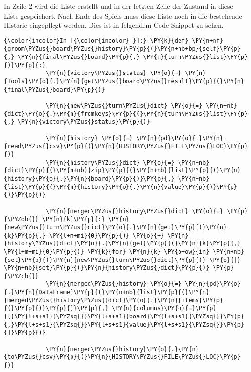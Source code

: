    In Zeile 2 wird die Liste erstellt und in der letzten Zeile der Zustand
in diese Liste gespeichert. Nach Ende des Spiels muss diese Liste noch
in die bestehende Historie eingepflegt werden. Dies ist in folgendem
Code-Snippet zu sehen.

    \begin{Verbatim}[commandchars=\\\{\}]
{\color{incolor}In [{\color{incolor} }]:} \PY{k}{def} \PY{n+nf}{groom\PYZus{}board\PYZus{}history}\PY{p}{(}\PY{n+nb+bp}{self}\PY{p}{,} \PY{n}{final\PYZus{}board}\PY{p}{,} \PY{n}{turn\PYZus{}list}\PY{p}{)}\PY{p}{:}
            \PY{n}{victory\PYZus{}status} \PY{o}{=} \PY{n}{Tools}\PY{o}{.}\PY{n}{get\PYZus{}board\PYZus{}result}\PY{p}{(}\PY{n}{final\PYZus{}board}\PY{p}{)}
        
            \PY{n}{new\PYZus{}turn\PYZus{}dict} \PY{o}{=} \PY{n+nb}{dict}\PY{o}{.}\PY{n}{fromkeys}\PY{p}{(}\PY{n}{turn\PYZus{}list}\PY{p}{,} \PY{n}{victory\PYZus{}status}\PY{p}{)}
        
            \PY{n}{history} \PY{o}{=} \PY{n}{pd}\PY{o}{.}\PY{n}{read\PYZus{}csv}\PY{p}{(}\PY{n}{HISTORY\PYZus{}FILE\PYZus{}LOC}\PY{p}{)}
            \PY{n}{history\PYZus{}dict} \PY{o}{=} \PY{n+nb}{dict}\PY{p}{(}\PY{n+nb}{zip}\PY{p}{(}\PY{n+nb}{list}\PY{p}{(}\PY{n}{history}\PY{o}{.}\PY{n}{board}\PY{p}{)}\PY{p}{,} \PY{n+nb}{list}\PY{p}{(}\PY{n}{history}\PY{o}{.}\PY{n}{value}\PY{p}{)}\PY{p}{)}\PY{p}{)}
        
            \PY{n}{merged\PYZus{}history\PYZus{}dict} \PY{o}{=} \PY{p}{\PYZob{}} \PY{n}{k}\PY{p}{:} \PY{n}{new\PYZus{}turn\PYZus{}dict}\PY{o}{.}\PY{n}{get}\PY{p}{(}\PY{n}{k}\PY{p}{,} \PY{l+m+mi}{0}\PY{p}{)} \PY{o}{+} \PY{n}{history\PYZus{}dict}\PY{o}{.}\PY{n}{get}\PY{p}{(}\PY{n}{k}\PY{p}{,} \PY{l+m+mi}{0}\PY{p}{)} \PY{k}{for} \PY{n}{k} \PY{o+ow}{in} \PY{n+nb}{set}\PY{p}{(}\PY{n}{new\PYZus{}turn\PYZus{}dict}\PY{p}{)} \PY{o}{|} \PY{n+nb}{set}\PY{p}{(}\PY{n}{history\PYZus{}dict}\PY{p}{)} \PY{p}{\PYZcb{}}
            \PY{n}{merged\PYZus{}history} \PY{o}{=} \PY{n}{pd}\PY{o}{.}\PY{n}{DataFrame}\PY{p}{(}\PY{n+nb}{list}\PY{p}{(}\PY{n}{merged\PYZus{}history\PYZus{}dict}\PY{o}{.}\PY{n}{items}\PY{p}{(}\PY{p}{)}\PY{p}{)}\PY{p}{,} \PY{n}{columns}\PY{o}{=}\PY{p}{[}\PY{l+s+s1}{\PYZsq{}}\PY{l+s+s1}{board}\PY{l+s+s1}{\PYZsq{}}\PY{p}{,}\PY{l+s+s1}{\PYZsq{}}\PY{l+s+s1}{value}\PY{l+s+s1}{\PYZsq{}}\PY{p}{]}\PY{p}{)}
        
            \PY{n}{merged\PYZus{}history}\PY{o}{.}\PY{n}{to\PYZus{}csv}\PY{p}{(}\PY{n}{HISTORY\PYZus{}FILE\PYZus{}LOC}\PY{p}{)}
\end{Verbatim}


